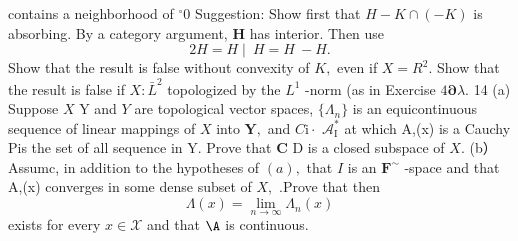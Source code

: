 contains a neighborhood of $^{\circ}0$ Suggestion: Show first that $H-K\cap(-K)$ is absorbing. By a category argument, ${\boldsymbol{H}}$ has interior. Then use $$ 2H=H\mid\ H=H\ -H. $$ Show that the result is false without convexity of $K,$ even if $X=R^{2}.$ Show that the result is false if $X:{\bar{L}}^{2}$ topologized by the $L^{1}$ -norm (as in Exercise $4\mathbf{\partial}\lambda.$ 14 (a) Suppose $\textstyle X$ Y and ${\mathbf{}}Y$ are topological vector spaces, $\{\Lambda_{n}\}$ is an equicontinuous sequence of linear mappings of $X$ into ${\boldsymbol{Y}},$ and $C{\mathrm{i}}\cdot$ ${\mathcal{A}}_{\mathrm{I}}^{*}$ at which {A,(x)} is a Cauchy Pis the set of all sequence in Y. Prove that ${\boldsymbol{C}}$ D is a closed subspace of $X.$ (b）Assumc, in addition to the hypotheses of $(a),$ that $\boldsymbol{\mathit{I}}$ is an ${\boldsymbol{F}}^{\sim}$ -space and that {A,(x)} converges in some dense subset of $X,$ .Prove that then $$ \Lambda(x)=\operatorname*{lim}_{n\to\infty}\Lambda_{n}(x) $$ exists for every $x\!\in\!{\mathcal{X}}$ and that $\mathrm{\A}$ is continuous.